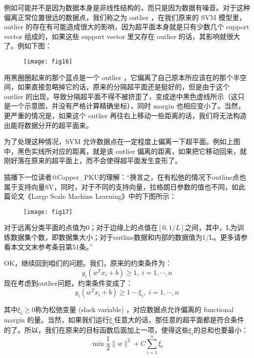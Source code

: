 \documentclass[a4paper,12pt]{article}
\begin{document}
例如可能并不是因为数据本身是非线性结构的，而只是因为数据有噪音。对于这种偏离正常位置很远的数据点，我们称之为 outlier ，在我们原来的 SVM 模型里，outlier 的存在有可能造成很大的影响，因为超平面本身就是只有少数几个 support vector 组成的，如果这些 support vector 里又存在 outlier 的话，其影响就很大了。例如下图：

\begin{figure}[H]
  \centering
  \texttt{[image: fig16]}
\end{figure}

用黑圈圈起来的那个蓝点是一个 outlier ，它偏离了自己原本所应该在的那个半空间，如果直接忽略掉它的话，原来的分隔超平面还是挺好的，但是由于这个 outlier 的出现，导致分隔超平面不得不被挤歪了，变成途中黑色虚线所示（这只是一个示意图，并没有严格计算精确坐标），同时 margin 也相应变小了。当然，更严重的情况是，如果这个 outlier 再往右上移动一些距离的话，我们将无法构造出能将数据分开的超平面来。

为了处理这种情况，SVM 允许数据点在一定程度上偏离一下超平面。例如上图中，黑色实线所对应的距离，就是该 outlier 偏离的距离，如果把它移动回来，就刚好落在原来的超平面上，而不会使得超平面发生变形了。

插播下一位读者@Copper\_PKU的理解：“换言之，在有松弛的情况下outline点也属于支持向量SV，同时，对于不同的支持向量，拉格朗日参数的值也不同，如此篇论文《Large Scale Machine Learning》中的下图所示：

\begin{figure}[H]
  \centering
  \texttt{[image: fig17]}
\end{figure}

 对于远离分类平面的点值为0；对于边缘上的点值在$[0, 1/L]$之间，其中，L为训练数据集个数，即数据集大小；对于outline数据和内部的数据值为1/L。更多请参看本文文末参考条目第51条。”

 OK，继续回到咱们的问题。我们，原来的约束条件为：
 \begin{equation}
   y_i(w^Tx_i+b)\geq1,\;i=1,\cdots,n
 \end{equation}
现在考虑到outlier问题，约束条件变成了：
\begin{equation}
   y_i(w^Tx_i+b)\geq1-\xi_i,\;i=1,\cdots,n
 \end{equation}

 其中$\xi_i\geq0$称为松弛变量 (slack variable) ，对应数据点允许偏离的 functional margin 的量。当然，如果我们运行$\xi_i$任意大的话，那任意的超平面都是符合条件的了。所以，我们在原来的目标函数后面加上一项，使得这些$\xi_i$的总和也要最小：
 \begin{equation}
   \min\frac{1}{2}\|w\|^2+C\sum_{i=1}^n\xi_i
 \end{equation}
\end{document}
